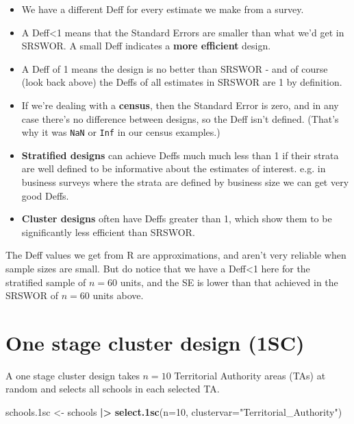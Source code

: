\documentclass[
]{book}
\newenvironment{Shaded}{\begin{snugshade}}{\end{snugshade}}
\newcommand{\AttributeTok}[1]{\textcolor[rgb]{0.13,0.29,0.53}{#1}}
\newcommand{\DecValTok}[1]{\textcolor[rgb]{0.00,0.00,0.81}{#1}}
\newcommand{\FloatTok}[1]{\textcolor[rgb]{0.00,0.00,0.81}{#1}}
\newcommand{\FunctionTok}[1]{\textcolor[rgb]{0.13,0.29,0.53}{\textbf{#1}}}
\newcommand{\NormalTok}[1]{#1}
\newcommand{\OtherTok}[1]{\textcolor[rgb]{0.56,0.35,0.01}{#1}}
\newcommand{\SpecialCharTok}[1]{\textcolor[rgb]{0.81,0.36,0.00}{\textbf{#1}}}
\newcommand{\StringTok}[1]{\textcolor[rgb]{0.31,0.60,0.02}{#1}}
\providecommand{\tightlist}{%
  \setlength{\itemsep}{0pt}\setlength{\parskip}{0pt}}
\begin{document}
\begin{itemize}
\tightlist
\item
  We have a different Deff for every estimate we make from a survey.
\item
  A Deff\textless1 means that the Standard Errors are smaller than what
  we'd get in SRSWOR. A small Deff indicates a \textbf{more efficient} design.
\item
  A Deff of 1 means the design is no better than SRSWOR - and of course
  (look back above) the Deffs of all estimates in SRSWOR are 1 by definition.
\item
  If we're dealing with a \textbf{census}, then the Standard Error is zero,
  and in any case there's no difference between designs, so the Deff
  isn't defined. (That's why it was \texttt{NaN} or \texttt{Inf} in our census examples.)
\item
  \textbf{Stratified designs} can achieve Deffs much much less than 1 if their strata
  are well defined to be informative about the estimates of interest. e.g.
  in business surveys where the strata are defined by business size we
  can get very good Deffs.
\item
  \textbf{Cluster designs} often have Deffs greater than 1, which show them to be
  significantly less efficient than SRSWOR.
\end{itemize}

The Deff values we get from R are approximations, and aren't very reliable
when sample sizes are small. But do notice that we have a Deff\textless1 here
for the stratified sample of \(n=60\) units, and the SE is lower than
that achieved in the SRSWOR of \(n=60\) units above.

\section{One stage cluster design (1SC)}\label{one-stage-cluster-design-1sc}

A one stage cluster design takes \(n=10\) Territorial Authority areas (TAs) at random
and selects all schools in each selected TA.

\begin{Shaded}
\begin{Highlighting}[]
\NormalTok{schools}\FloatTok{.1}\NormalTok{sc }\OtherTok{\textless{}{-}}\NormalTok{ schools }\SpecialCharTok{|\textgreater{}} \FunctionTok{select.1sc}\NormalTok{(}\AttributeTok{n=}\DecValTok{10}\NormalTok{, }\AttributeTok{clustervar=}\StringTok{"Territorial\_Authority"}\NormalTok{)}
\end{Highlighting}
\end{Shaded}
\end{document}
